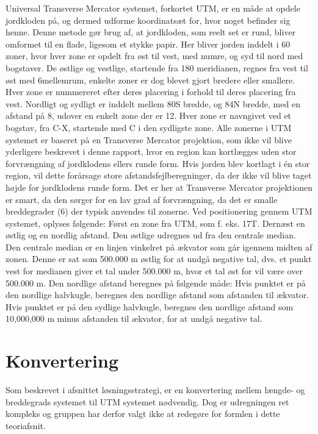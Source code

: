 Universal Transverse Mercator systemet, forkortet UTM, er en måde at opdele jordkloden på, og dermed udforme koordinatsæt for, hvor noget befinder sig henne. Denne metode gør brug af, at jordkloden, som reelt set er rund, bliver omformet til en flade, ligesom et stykke papir. Her bliver jorden inddelt i 60 zoner, hvor hver zone er opdelt fra øst til vest, med numre, og syd til nord med bogstaver. De østlige og vestlige, startende fra 180 meridianen, regnes fra vest til øst med 6\textdegree mellemrum, enkelte zoner er dog blevet gjort bredere eller smallere. Hver zone er nummereret efter deres placering i forhold til deres placering fra vest.\newline
Nordligt og sydligt er inddelt mellem 80\textdegree S bredde, og 84\textdegree N bredde, med en afstand på 8\textdegree, udover en enkelt zone der er 12\textdegree. Hver zone er  navngivet ved et bogstav, fra C-X, startende med C i den sydligste zone.
Alle zonerne i UTM systemet er baseret på en Transverse Mercator projektion, som ikke vil blive yderligere beskrevet i denne rapport, hvor en region kan kortlægges uden stor forvrængning af jordklodens ellers runde form. Hvis jorden blev kortlagt i én stor region, vil dette forårsage store afstandsfejlberegninger, da der ikke vil blive taget højde for jordklodens runde form. Det er her at Transverse Mercator projektionen er smart, da den sørger for en lav grad af forvrængning, da det er smalle breddegrader (6\textdegree) der typisk anvendes til zonerne. \newline
Ved positionering gennem UTM systemet, oplyses følgende: Først en zone fra UTM, som f. eks. 17T. Dernæst en østlig og en nordlig afstand. Den østlige udregnes ud fra den centrale median. Den centrale median er en linjen vinkelret på ækvator som går igennem midten af zonen. Denne er sat som 500.000 m østlig for at undgå negative tal, dvs. et punkt vest for medianen giver et tal under 500.000 m, hvor et tal øst for vil være over 500.000 m.  Den nordlige afstand beregnes på følgende måde: Hvis punktet er på den nordlige halvkugle, beregnes den nordlige afstand som afstanden til ækvator. Hvis punktet er på den sydlige halvkugle, beregnes den nordlige afstand som 10,000,000 m minus afstanden til ækvator, for at undgå negative tal. \citep{UTMTeori}

\section{Konvertering}
Som beskrevet i afsnittet løsningsstrategi, er en konvertering mellem længde- og breddegrads systemet til UTM systemet nødvendig. Dog er udregningen ret kompleks og gruppen har derfor valgt ikke at redegøre for formlen i dette teoriafsnit.

